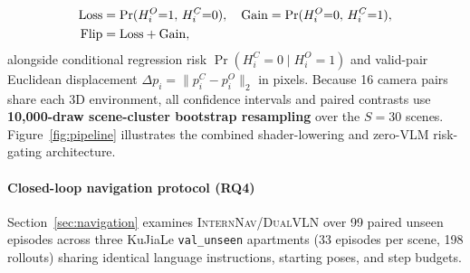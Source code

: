 \begin{align}
\mathrm{Loss} &= \Pr(H_i^O{=}1,\, H_i^C{=}0), \quad
\mathrm{Gain} = \Pr(H_i^O{=}0,\, H_i^C{=}1), \notag\\
\mathrm{Flip} &= \mathrm{Loss} + \mathrm{Gain},
\label{eq:turnover}
\end{align}
alongside conditional regression risk $\Pr(H_i^C{=}0 \mid H_i^O{=}1)$ and valid-pair Euclidean displacement $\Delta p_i = \|p_i^C - p_i^O\|_2$ in pixels. Because 16 camera pairs share each 3D environment, all confidence intervals and paired contrasts use \textbf{10,000-draw scene-cluster bootstrap resampling} over the $S=30$ scenes. Figure~\ref{fig:pipeline} illustrates the combined shader-lowering and zero-\textsc{VLM} risk-gating architecture.

\paragraph{Closed-loop navigation protocol (\textbf{RQ4})}
Section~\ref{sec:navigation} examines \textsc{InternNav/DualVLN} \citep{Wei2026Ground} over 99 paired unseen episodes across three KuJiaLe \texttt{val\_unseen} apartments (33 episodes per scene, 198 rollouts) sharing identical language instructions, starting poses, and step budgets.
